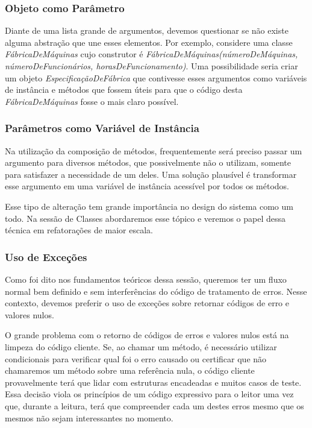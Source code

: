 


\subsubsection{Objeto como Parâmetro}
Diante de uma lista grande de argumentos, devemos questionar se não existe alguma abstração que une esses elementos. Por exemplo, considere uma classe \textit{FábricaDeMáquinas} cujo construtor é \textit{FábricaDeMáquinas(númeroDeMáquinas, númeroDeFuncionários, horasDeFuncionamento)}. Uma possibilidade seria criar um objeto \textit{EspecificaçãoDeFábrica} que contivesse esses argumentos como variáveis de instância e métodos que fossem úteis para que o código desta \textit{FábricaDeMáquinas} fosse o mais claro possível.

\subsubsection{Parâmetros como Variável de Instância}
\label{metodos:parametros}
Na utilização da composição de métodos, frequentemente será preciso passar um argumento para diversos métodos, que possivelmente não o utilizam, somente para satisfazer a necessidade de um deles. Uma solução plausível é transformar esse argumento em uma variável de instância acessível por todos os métodos.
	
Esse tipo de alteração tem grande importância no design do sistema como um todo. Na sessão de Classes abordaremos esse tópico e veremos o papel dessa técnica em refatorações de maior escala.

\subsubsection{Uso de Exceções}
Como foi dito nos fundamentos teóricos dessa sessão, queremos ter um fluxo normal bem definido e sem interferências do código de tratamento de erros. Nesse contexto, devemos preferir o uso de exceções sobre retornar códigos de erro e valores nulos.
	
O grande problema com o retorno de códigos de erros e valores nulos está na limpeza do código cliente. Se, ao chamar um método, é necessário utilizar condicionais para verificar qual foi o erro causado ou certificar que não chamaremos um método sobre uma referência nula, o código cliente provavelmente terá que lidar com estruturas encadeadas e muitos casos de teste. Essa decisão viola os princípios de um código expressivo para o leitor uma vez que, durante a leitura, terá que compreender cada um destes erros mesmo que os mesmos não sejam interessantes no momento.

